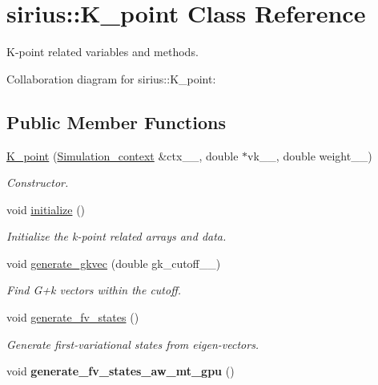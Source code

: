 \hypertarget{classsirius_1_1_k__point}{}\section{sirius\+:\+:K\+\_\+point Class Reference}
\label{classsirius_1_1_k__point}


K-\/point related variables and methods.  




Collaboration diagram for sirius\+:\+:K\+\_\+point\+:
\subsection*{Public Member Functions}
\begin{DoxyCompactItemize}
\item 
\hyperlink{classsirius_1_1_k__point_a0374ed7edcb5177b7e8a03f2722c6090}{K\+\_\+point} (\hyperlink{classsirius_1_1_simulation__context}{Simulation\+\_\+context} \&ctx\+\_\+\+\_\+, double $\ast$vk\+\_\+\+\_\+, double weight\+\_\+\+\_\+)
\begin{DoxyCompactList}\small\item\em Constructor. \end{DoxyCompactList}\item 
void \hyperlink{classsirius_1_1_k__point_a6b81e097804738feac48d2a33c4b4aa7}{initialize} ()
\begin{DoxyCompactList}\small\item\em Initialize the k-\/point related arrays and data. \end{DoxyCompactList}\item 
void \hyperlink{classsirius_1_1_k__point_a3b0c4ae54e8c7f8da88701e5015ab16c}{generate\+\_\+gkvec} (double gk\+\_\+cutoff\+\_\+\+\_\+)
\begin{DoxyCompactList}\small\item\em Find G+k vectors within the cutoff. \end{DoxyCompactList}\item 
void \hyperlink{classsirius_1_1_k__point_a021e78d67ecff5256537c1b4e03e1c3d}{generate\+\_\+fv\+\_\+states} ()
\begin{DoxyCompactList}\small\item\em Generate first-\/variational states from eigen-\/vectors. \end{DoxyCompactList}\item 
\hypertarget{classsirius_1_1_k__point_a1e4dc00e38bd012ae2f2f9af70fdb62e}{}void {\bfseries generate\+\_\+fv\+\_\+states\+\_\+aw\+\_\+mt\+\_\+gpu} ()\label{classsirius_1_1_k__point_a1e4dc00e38bd012ae2f2f9af70fdb62e}


\end{DoxyCompactItemize}
